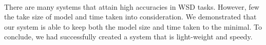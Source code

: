 
\paragraph{}
There are many systems that attain high accuracies in WSD tasks. However, few the take size of model and time taken into consideration. We demonstrated that our system is able to keep both the model size and time taken to the minimal. To conclude, we had successfully created a system that is light-weight and speedy.
